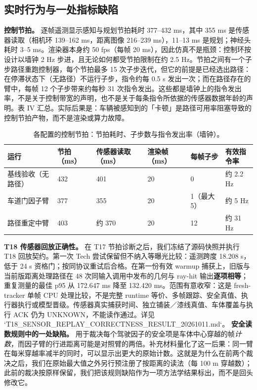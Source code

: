 \documentclass[journal]{IEEEtran}
\begin{document}
\subsection{实时行为与一处指标缺陷}
\textbf{控制节拍。} 逐帧遥测显示感知与规划节拍耗时 377--432 ms，其中 355 ms 是传感器读取（相机环 139--162 ms，距离图像 216--239 ms），11--13 ms 是规划；神经头耗时 3--5 ms。渲染器本身约 50 fps（每帧 20 ms），因此仿真不是瓶颈：控制环按设计以墙钟 2 Hz 步进，且无论如何都受节拍限制在约 2.5 Hz。节拍之间有一个子步路径重跑控制器，每个节拍最多 15 次子步迭代，但它的前提是已经选出路径：在停滞状态下（无路径）不运行子步，指令约每 0.5 s 发出一次；而在路径存在的臂中，每帧 12 个子步带来约每秒 31 次指令发出。这些都是墙钟上的指令发出率，不是关于控制带宽的声明，也不是关于每条指令所依据的传感器数据年龄的声明。表 IV 汇总。实际后果是：车辆被感知到的「卡顿」是路径可用率阻塞导致的控制节拍产物，而不是渲染或算力故障。
\begin{table}[!t]
\centering
\caption{各配置的控制节拍：节拍耗时、子步数与指令发出率（墙钟）。}
\begin{tabular}{@{}llllll@{}}
\toprule
运行 & 节拍（ms） & 传感器读取（ms） & 渲染帧（ms） & 每帧子步 & 有效指令率 \\
\midrule
基线验收（无路径） & 432 & 401 & 20 & 0 & 约 2.2 Hz \\
车道门因子臂 & 377 & 355 & 20 & 1（最大 5） & 约 5 Hz \\
路径重定中臂 & 403 & 约 370 & 20 & 12 & 约 31 Hz \\
\bottomrule
\end{tabular}
\end{table}
\textbf{T18 传感器回放正确性。} 在 T17 节拍诊断之后，我们冻结了源码快照并执行 T18 回放契约。第一次 Tech 尝试保留但不纳入等曝光比较：遥测跨度 18.208 s，低于 24 s 资格门；按同协议重试后合格。在第一份有效 warmup 捕获上，旧版与当前版距离处理路径在 48 次同输入调用中发布的几何与 ray-hit 输出\textbf{逐项相等}；重复测量的最佳 p95 从 172.647 ms 降至 132.420 ms。范围有意收窄：这是 fresh-tracker 单帧 CPU 处理比较，不是完整 runtime 等价、多帧跟踪、安全真值、执行器执行或模型晋级。传感器真实捕获时间、独立铺装／漆线真值、车体覆盖与执行 ACK 仍为 UNKNOWN，不能读作通过。详见 `T18_SENSOR_REPLAY_CORRECTNESS_RESULT_20261011.md`。
\textbf{安全读数规则中的一处缺陷。} 用于裁决每个驾驶因子的安全项是车体中心穿越的帧\emph{计数}，而因子臂的行进距离可能是对照臂的两倍。补充材料量化了这一后果：同一臂在每米穿越率减半的同时，可以显示出更大的原始计数。这就是为什么在前两个裁决之后，我们在原始最大值之外另行预注册了按距离的读法（每 100 m 穿越数）；此前的裁决按原样保留，我们把该规则缺陷作为一项方法学结果标出，而不是回头修改它。
\end{document}
